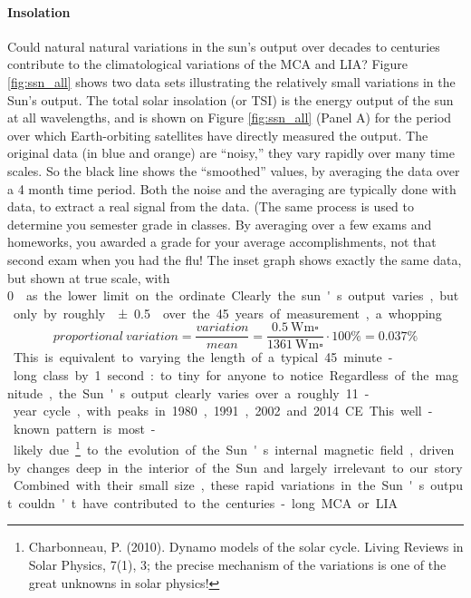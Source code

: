 \paragraph{Insolation}
Could natural natural variations in the sun's output over decades to centuries contribute to the climatological variations of the MCA and LIA? Figure \ref{fig:ssn_all} shows two data sets illustrating the relatively small variations in the Sun's output. The total solar insolation (or TSI) is the energy output of the sun at all wavelengths, and is shown on Figure \ref{fig:ssn_all} (Panel A) for the period over which Earth-orbiting satellites have directly measured the output. The original data (in blue and orange) are ``noisy,'' they vary rapidly over many time scales. So the black line shows the ``smoothed'' values, by averaging the data over a 4 month time period. Both the noise and the averaging are typically done with data, to extract a real signal from the data. (The same process is used to determine you semester grade in classes. By averaging over a few exams and homeworks, you awarded a grade for your average accomplishments, not that second exam when you had the flu! The inset graph shows exactly the same data, but shown at true scale, with \SI{0}{\watt\metre\square} as the lower limit on the ordinate. Clearly the sun's output varies, but only by roughly \SI{\pm 0.5}{\watt\metre\square} over the 45 years of measurement, a whopping
\begin{equation}
	proportional\ variation=\frac{variation}{mean}=\frac{\SI{0.5}{\watt\metre\square}}{\SI{1361}{\watt\metre\square}}\cdot100\%=0.037\%
\end{equation}
This is equivalent to varying the length of a typical 45 minute-long class by 1 second: to tiny for anyone to notice. Regardless of the magnitude, the Sun's output clearly varies over a roughly 11-year cycle, with peaks in 1980, 1991, 2002 and 2014 CE. This well-known pattern is most-likely due\footnote{Charbonneau, P. (2010). Dynamo models of the solar cycle. Living Reviews in Solar Physics, 7(1), 3; the precise mechanism of the variations is one of the great unknowns in solar physics!} to the evolution of the Sun's internal magnetic field, driven by changes deep in the interior of the Sun and largely irrelevant to our story. Combined with their small size, these rapid variations in the Sun's output couldn't have contributed to the centuries-long MCA or LIA.\\
